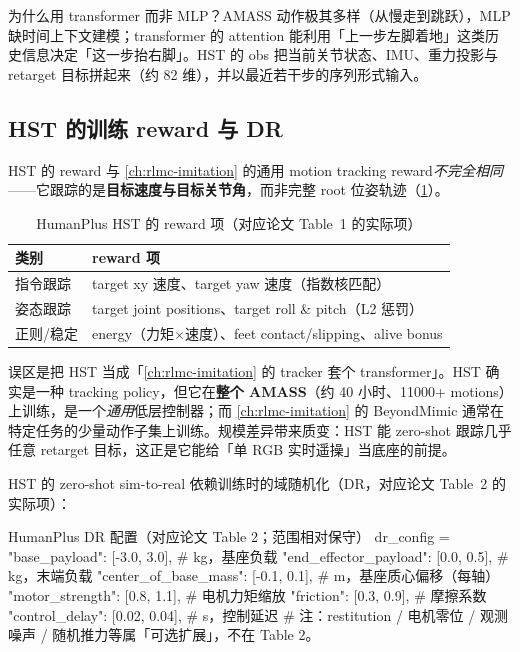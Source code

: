 为什么用 transformer 而非 MLP？AMASS 动作极其多样（从慢走到跳跃），MLP 缺时间上下文建模；transformer 的 attention 能利用「上一步左脚着地」这类历史信息决定「这一步抬右脚」。HST 的 obs 把当前关节状态、IMU、重力投影与 retarget 目标拼起来（约 82 维），并以最近若干步的序列形式输入。

\subsection{HST 的训练 reward 与 DR}
\label{sec:rlmc-mm-humanplus-reward}

HST 的 reward 与 \cref{ch:rlmc-imitation} 的通用 motion tracking reward\emph{不完全相同}——它跟踪的是\textbf{目标速度与目标关节角}，而非完整 root 位姿轨迹（\cref{tab:rlmc-mm-hst-reward}）。

\begin{table}[ht]
\centering
\small
\caption{HumanPlus HST 的 reward 项（对应论文 Table~1 的实际项）}
\label{tab:rlmc-mm-hst-reward}
\begin{tabular}{@{}lp{6.4cm}@{}}
\toprule
类别 & reward 项 \\
\midrule
指令跟踪 & target xy 速度、target yaw 速度（指数核匹配） \\
姿态跟踪 & target joint positions、target roll \& pitch（L2 惩罚） \\
正则/稳定 & energy（力矩$\times$速度）、feet contact/slipping、alive bonus \\
\bottomrule
\end{tabular}
\end{table}

\begin{insight}\label{ins:rlmc-mm-hst-general}
误区是把 HST 当成「\cref{ch:rlmc-imitation} 的 tracker 套个 transformer」。HST 确实是一种 tracking policy，但它在\textbf{整个 AMASS}（约 40 小时、11000+ motions）上训练，是一个\emph{通用}低层控制器；而 \cref{ch:rlmc-imitation} 的 BeyondMimic 通常在特定任务的少量动作子集上训练。规模差异带来质变：HST 能 zero-shot 跟踪几乎任意 retarget 目标，这正是它能给「单 RGB 实时遥操」当底座的前提。
\end{insight}

HST 的 zero-shot sim-to-real 依赖训练时的域随机化（DR，对应论文 Table~2 的实际项）：

\begin{codebox}[Python]{HumanPlus DR 配置（对应论文 Table 2；范围相对保守）}
dr_config = {
    "base_payload":         [-3.0, 3.0],    # kg，基座负载
    "end_effector_payload": [0.0, 0.5],     # kg，末端负载
    "center_of_base_mass":  [-0.1, 0.1],    # m，基座质心偏移（每轴）
    "motor_strength":       [0.8, 1.1],     # 电机力矩缩放
    "friction":             [0.3, 0.9],     # 摩擦系数
    "control_delay":        [0.02, 0.04],   # s，控制延迟
}
# 注：restitution / 电机零位 / 观测噪声 / 随机推力等属「可选扩展」，不在 Table 2。
\end{codebox}

